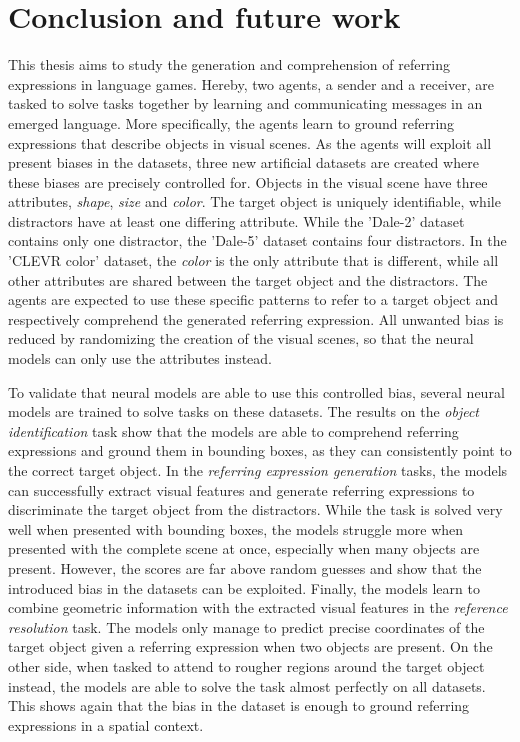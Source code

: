 \section{Conclusion and future work}
\label{sec:conclusion}

This thesis aims to study the generation and comprehension of referring expressions in language games.
Hereby, two agents, a sender and a receiver, are tasked to solve tasks together by learning and communicating messages in an emerged language.
More specifically, the agents learn to ground referring expressions that describe objects in visual scenes.
As the agents will exploit all present biases in the datasets, three new artificial datasets are created where these biases are precisely controlled for.
Objects in the visual scene have three attributes, \emph{shape}, \emph{size} and \emph{color}.
The target object is uniquely identifiable, while distractors have at least one differing attribute.
While the 'Dale-2' dataset contains only one distractor, the 'Dale-5' dataset contains four distractors.
In the 'CLEVR color' dataset, the \emph{color} is the only attribute that is different, while all other attributes are shared between the target object and the distractors.
The agents are expected to use these specific patterns to refer to a target object and respectively comprehend the generated referring expression.
All unwanted bias is reduced by randomizing the creation of the visual scenes, so that the neural models can only use the attributes instead.

To validate that neural models are able to use this controlled bias, several neural models are trained to solve tasks on these datasets.
The results on the \emph{object identification} task show that the models are able to comprehend referring expressions and ground them in bounding boxes, as they can consistently point to the correct target object.
In the \emph{referring expression generation} tasks, the models can successfully extract visual features and generate referring expressions to discriminate the target object from the distractors.
While the task is solved very well when presented with bounding boxes, the models struggle more when presented with the complete scene at once, especially when many objects are present.
However, the scores are far above random guesses and show that the introduced bias in the datasets can be exploited.
Finally, the models learn to combine geometric information with the extracted visual features in the \emph{reference resolution} task.
The models only manage to predict precise coordinates of the target object given a referring expression when two objects are present.
On the other side, when tasked to attend to rougher regions around the target object instead, the models are able to solve the task almost perfectly on all datasets.
This shows again that the bias in the dataset is enough to ground referring expressions in a spatial context.

